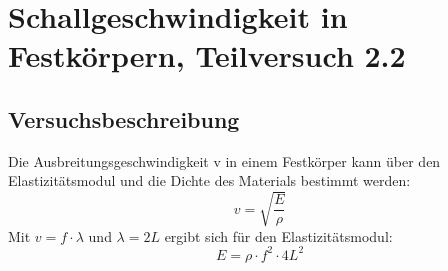 \documentclass[12pt,a4paper]{article}
\author{Gruppe C14 \\ Julián Häck, Martin Koytek, Lars Wenning, Erik Zimmermann}
\begin{document}
\section{Schallgeschwindigkeit in Festkörpern, Teilversuch 2.2}
\subsection{Versuchsbeschreibung}
Die Ausbreitungsgeschwindigkeit v in einem Festkörper kann über den Elastizitätsmodul und die Dichte des Materials bestimmt werden:
\begin{equation}
v=\sqrt{\frac{E}{\rho}}
\end{equation}
Mit $v=f\cdot \lambda$ und $\lambda=2L$ ergibt sich für den Elastizitätsmodul:
\begin{equation}
E= \rho\cdot f^2\cdot 4L^2
\end{equation}
\end{document}
